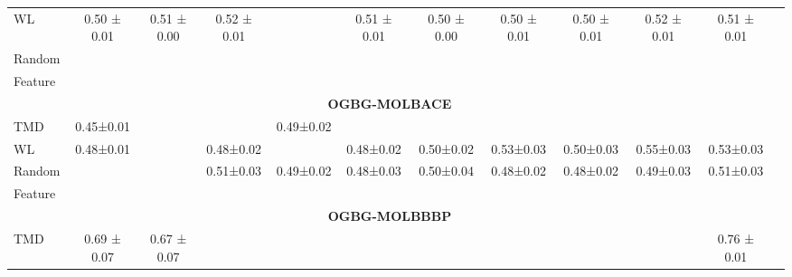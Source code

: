 \begin{table}[ht]
{\begin{tabular}{lccccccccccc}
WL & 0.50 ± 0.01 & 0.51 ± 0.00 & 0.52 ± 0.01 & \cellcolor{green!25}{0.51 ± 0.01} & 0.51 ± 0.01 & 0.50 ± 0.00 & 0.50 ± 0.01 & 0.50 ± 0.01 & 0.52 ± 0.01 & 0.51 ± 0.01 \\
Random & \cellcolor{green!80}{0.56 ± 0.02} & \cellcolor{green!80}{0.60 ± 0.02} & \cellcolor{green!25}{0.60 ± 0.02} & \cellcolor{green!80}{0.61 ± 0.00} & \cellcolor{green!80}{0.63 ± 0.01} & \cellcolor{green!80}{0.62 ± 0.01} & \cellcolor{green!80}{0.63 ± 0.01} & \cellcolor{green!80}{0.62 ± 0.01} & \cellcolor{green!25}{0.62 ± 0.02} & \cellcolor{green!80}{0.64 ± 0.01} \\
Feature & \cellcolor{green!25}{0.53 ± 0.01} & \cellcolor{green!80}{0.60 ± 0.02} & \cellcolor{green!80}{0.61 ± 0.01} & \cellcolor{green!80}{0.61 ± 0.02} & \cellcolor{green!80}{0.63 ± 0.01} & \cellcolor{green!25}{0.60 ± 0.02} & \cellcolor{green!25}{0.62 ± 0.02} & \cellcolor{green!80}{0.62 ± 0.01} & \cellcolor{green!80}{0.63 ± 0.00} & \cellcolor{green!25}{0.62 ± 0.01} \\
\midrule
\multicolumn{11}{c}{\textbf{OGBG-MOLBACE}} \\
\midrule
TMD & 0.45±0.01 & \cellcolor{green!80}{0.52±0.03} & \cellcolor{green!80}{0.55±0.04} & 0.49±0.02 & \cellcolor{green!25}{0.54±0.03} & \cellcolor{green!80}{0.54±0.03} & \cellcolor{green!80}{0.58±0.03} & \cellcolor{green!80}{0.60±0.03} & \cellcolor{green!80}{0.57±0.02} & \cellcolor{green!80}{0.58±0.02} \\
WL & 0.48±0.01 & \cellcolor{green!25}{0.49±0.02} & 0.48±0.02 & \cellcolor{green!25}{0.51±0.03} & 0.48±0.02 & 0.50±0.02 & 0.53±0.03 & 0.50±0.03 & 0.55±0.03 & 0.53±0.03 \\
Random & \cellcolor{green!25}{0.49±0.02} & \cellcolor{green!25}{0.49±0.03} & 0.51±0.03 & 0.49±0.02 & 0.48±0.03 & 0.50±0.04 & 0.48±0.02 & 0.48±0.02 & 0.49±0.03 & 0.51±0.03 \\
Feature & \cellcolor{green!80}{0.50±0.03} & \cellcolor{green!80}{0.52±0.03} & \cellcolor{green!25}{0.53±0.02} & \cellcolor{green!80}{0.55±0.02} & \cellcolor{green!80}{0.55±0.02} & \cellcolor{green!25}{0.51±0.02} & \cellcolor{green!25}{0.55±0.02} & \cellcolor{green!25}{0.56±0.03} & \cellcolor{green!25}{0.56±0.02} & \cellcolor{green!25}{0.56±0.02} \\
\midrule
\multicolumn{11}{c}{\textbf{OGBG-MOLBBBP}} \\
\midrule
TMD & 0.69 ± 0.07 & 0.67 ± 0.07 & \cellcolor{green!25}{0.75 ± 0.02} & \cellcolor{green!80}{0.76 ± 0.00} & \cellcolor{green!80}{0.76 ± 0.01} & \cellcolor{green!80}{0.77 ± 0.02} & \cellcolor{green!25}{0.77 ± 0.01} & \cellcolor{green!25}{0.76 ± 0.01} & \cellcolor{green!25}{0.76 ± 0.01} & 0.76 ± 0.01 \\

\end{tabular}}
\end{table}
